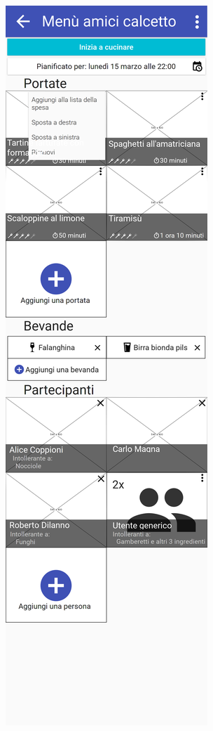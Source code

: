 \begin{figure}[H]
	\begin{minipage}{.49\textwidth}
		\includegraphics[width=\textwidth]{img/wireframe/men_amici_calcetto_puntini_portata.png}

\end{minipage}
\end{figure}
